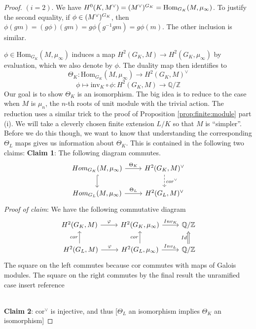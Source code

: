 \documentclass[class=article, crop=false]{standalone}
\begin{document}
\begin{proof}
$(i=2)$. We have 
$H^0(K,M^\vee)=(M^\vee)^{G_K}=\text{Hom}_{G_K}(M, \mu_{\infty})$.
To justify the second equality, if 
$\phi \in (M^\vee)^{G_K}$, then 
$\phi(gm)=(g\phi)(gm)=g\phi(g^{-1}gm)=g\phi(m)$. 
The other inclusion is similar.
\par 
$\phi \in \text{Hom}_{G_K}(M,\mu_{\infty})$ induces a map $H^2(G_K,M) \to H^2(G_K,\mu_{\infty})$ by evaluation, which we also denote by $\phi$. The duality map then identifies to
\[\Theta_K:\text{Hom}_{G_K}(M, \mu_{\infty}) \to H^2(G_K,M)^{\vee}\]
\[\phi \mapsto \text{inv}_K\circ \phi :H^2(G_K,M)\to \mathbb{Q}/\mathbb{Z}\]
Our goal is to show $\Theta_K$ is an isomorphism. 
The big idea is to reduce to the case when \(M\) is 
\(\mu_{n}\), the \(n\)-th roots of unit module with the trivial
action.
The reduction uses a similar trick to the proof of 
Proposition \ref{prop:finite:module} part (i).
We will take a cleverly chosen finite extension 
$L/K$ so that $M$ is ``simpler''. 
Before we do this though, we want to know that 
understanding the corresponding $\Theta_L$ maps 
gives us information about $\Theta_K$. 
This is contained in the following two claims:
\vskip 5pt
\textbf{Claim 1}: The following diagram commutes.
\[\begin{tikzcd}
{Hom_{G_K}(M,\mu_{\infty})} \arrow[r, "\Theta_K"] \arrow[d, hook] & {H^2(G_K, M)^{\vee}} \arrow[d, "cor^{\vee}", dashed] \\
{Hom_{G_L}(M,\mu_{\infty})} \arrow[r, "\Theta_L"]                 & {H^2(G_L,M)^{\vee}}                                 
\end{tikzcd}\]
\textit{Proof of claim}: We have the following commutative diagram
\[\begin{tikzcd}
 {H^2(G_K,M)} \arrow[r, "\varphi"] & {H^2(G_K,\mu_{\infty})} \arrow[r, "Inv_K"]                    & \mathbb{Q}/\mathbb{Z}                             \\\
 {H^2(G_L,M) } \arrow[r, "\varphi"] \arrow[u, "cor"] & 
 {H^2(G_L,\mu_{\infty})} \arrow[r, "Inv_L"] \arrow[u, "cor"] & \mathbb{Q}/\mathbb{Z} \arrow[u, "Id", Rightarrow]
\end{tikzcd}\]
The square on the left commutes because cor commutes with maps of Galois modules. 
The square on the right commutes by the final result the unramified 
case {\color{red} insert reference}
\par 
\mbox{}\hfill \qedsymbol
\\
\textbf{Claim 2}: $\text{cor}^{\vee}$ is injective, and thus [$\Theta_L$ an isomorphism implies $\Theta_K$ an isomorphism]

\end{proof}
\end{document}
